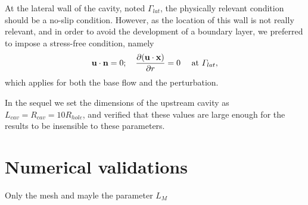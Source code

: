 \documentclass{jfm}
\newcommand\be{\begin{equation}}
\newcommand\ee{\end{equation}}
\newcommand\DP[2]{\frac{\p #1}{\p #2}}
\begin{document}
At the lateral wall of the cavity, noted $\Gamma_{lat}$, the physically relevant condition should be a no-slip condition. However, as the location of this wall is not really relevant, and in order to avoid the development of a boundary layer, 
we preferred to impose a stress-free condition, namely  
\be
 {\bf u} \cdot {\bf n} = 0 ; \quad \DP{({\bf u} \cdot {\bf x})}{r} = 0 \quad \mbox{  at  } \Gamma_{lat},
 \ee
which applies for both the base flow and the perturbation.

In the sequel we set the dimensions of the upstream cavity as $L_{cav} = R_{cav} = 10 R_{hole}$,
and verified that these values are large enough for the results to be insensible to these parameters.



\section{Numerical validations}
Only the mesh and mayle the parameter $L_M$






\end{document}
